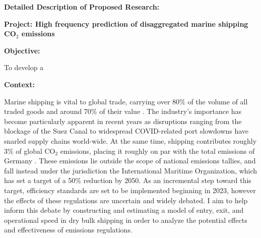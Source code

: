 \documentclass[12pt,letterpaper]{article}
\begin{document}


    

\begin{center}
\textbf{Detailed Description of Proposed Research: }\vspace{-0.25cm}
\end{center}

\noindent \textbf{Project: High frequency prediction of disaggregated marine shipping CO$_2$ emissions} 
\smallskip 

\noindent \textbf{Objective:} 

To develop a 
\smallskip 

\noindent \textbf{Context:}  

Marine shipping is vital to global trade, carrying over 80\% of the volume of all traded goods and around 70\% of their value \citep{unctad2017review}. The industry's importance has become particularly apparent in recent years as disruptions ranging from the blockage of the Suez Canal to widespread COVID-related port slowdowns have snarled supply chains world-wide. At the same time, shipping contributes roughly 3\% of global CO$_2$ emissions, placing it roughly on par with the total emissions of Germany \citep*{faber2020fourth}. These emissions lie outside the scope of national emissions tallies, and fall instead under the jurisdiction the International Maritime Organization, which has set a target of a 50\% reduction by 2050. As an incremental step toward this target, efficiency standards are set to be implemented beginning in 2023, however the effects of these regulations are uncertain and widely debated. I aim to help inform this debate by constructing and estimating a model of entry, exit, and operational speed in dry bulk shipping in order to analyze the potential effects and effectiveness of emissions regulations.
\end{document}
